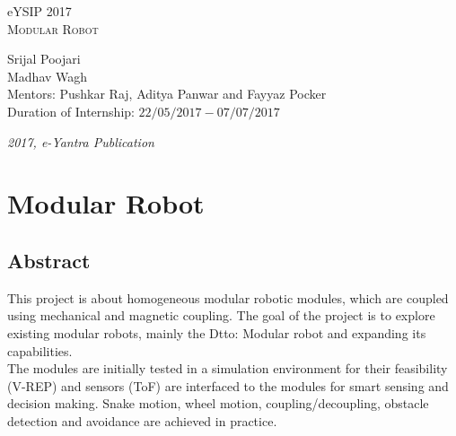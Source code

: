 \documentclass[a4paper,12pt,oneside]{book}
\begin{document}
\begin{titlepage}
\raggedright
{\Large eYSIP 2017\\[1cm]}
{\Huge\scshape Modular Robot \\[.1in]}
\vfill
\begin{flushright}
{\large Srijal Poojari \\}
{\large Madhav Wagh \\}
{\large Mentors: Pushkar Raj, Aditya Panwar and Fayyaz Pocker \\}
{\large Duration of Internship: $ 22/05/2017-07/07/2017 $ \\}
\end{flushright}

{\itshape 2017, e-Yantra Publication}
\end{titlepage}

\chapter[Project Tag]{Modular Robot}
\section*{Abstract}
  This project is about homogeneous modular robotic modules, 
  which are coupled using mechanical and magnetic coupling. 
  The goal of the project is to explore existing modular robots, mainly the Dtto: Modular robot and expanding its capabilities. \\
  The modules are initially tested in a simulation environment for their feasibility (V-REP) and sensors (ToF) are interfaced to the modules for smart sensing and decision making. Snake motion, wheel motion, coupling/decoupling, obstacle detection and avoidance are achieved in practice. 
\end{document}
